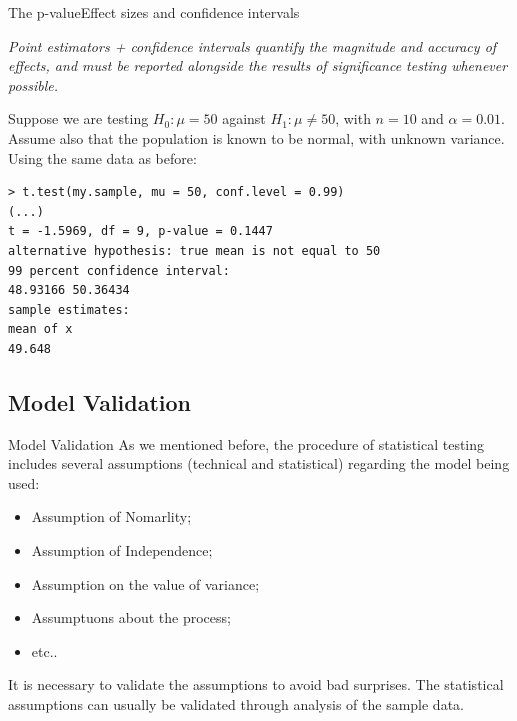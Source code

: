 \begin{frame}[fragile]{The p-value}{Effect sizes and confidence intervals}
  \begin{block}{}
    \begin{center}
      \emph{Point estimators + confidence intervals quantify the magnitude and accuracy of effects, and must be reported alongside the results of significance testing whenever possible.}
    \end{center}
  \end{block}
  Suppose we are testing $H_0: \mu = 50$ against $H_1: \mu \neq 50$, with $n=10$ and $\alpha = 0.01$. Assume also that the population is known to be normal, with unknown variance. Using the same data as before:
{\smaller
\begin{verbatim}
> t.test(my.sample, mu = 50, conf.level = 0.99)
(...)
t = -1.5969, df = 9, p-value = 0.1447
alternative hypothesis: true mean is not equal to 50
99 percent confidence interval:
48.93166 50.36434
sample estimates:
mean of x
49.648
\end{verbatim}}
\end{frame}

\subsection{Model Validation}
\begin{frame}{Model Validation}
  As we mentioned before, the procedure of statistical testing includes several assumptions (technical and statistical) regarding the model being used:\medskip
  \begin{itemize}
    \item Assumption of Nomarlity;
    \item Assumption of Independence;
    \item Assumption on the value of variance;
    \item Assumptuons about the process;
    \item etc..
  \end{itemize}\bigskip

  It is necessary to validate the assumptions to avoid bad surprises. The statistical assumptions can usually be validated through analysis of the sample data.
\end{frame}

